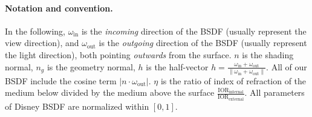 \paragraph{Notation and convention.} In the following, $\omega_{\text{in}}$ is the \emph{incoming} direction of the BSDF (usually represent the view direction), and $\omega_{\text{out}}$ is the \emph{outgoing} direction of the BSDF (usually represent the light direction), both pointing \emph{outwards} from the surface. $n$ is the shading normal, $n_g$ is the geometry normal, $h$ is the half-vector $h = \frac{\omega_{\text{in}} + \omega_{\text{out}}}{\|\omega_{\text{in}} + \omega_{\text{out}}\|}$. All of our BSDF include the cosine term $|n \cdot \omega_{\text{out}}|$. $\eta$ is the ratio of index of refraction of the medium below divided by the medium above the surface $\frac{\text{IOR}_{\text{internal}}}{\text{IOR}_{\text{external}}}$. All parameters of Disney BSDF are normalized within $[0, 1]$.

